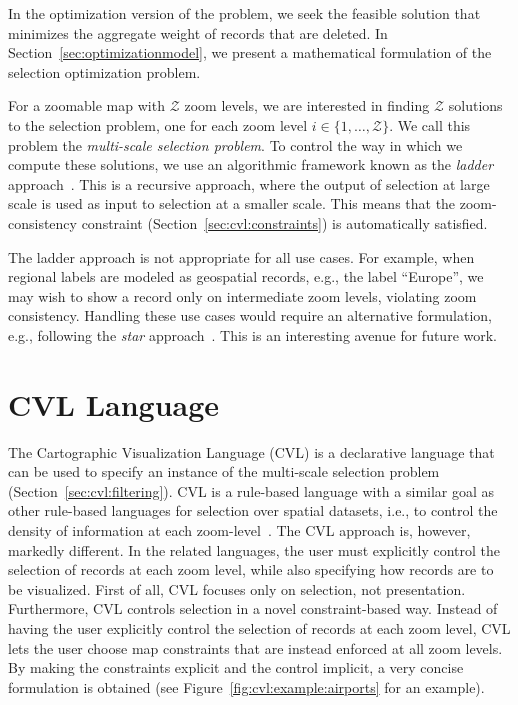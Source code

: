 \documentclass[11pt, oneside]{report}
\begin{document}
{In the optimization version of the problem, we seek the feasible solution that minimizes the aggregate weight of records that are deleted. In Section~\ref{sec:optimizationmodel}, we present a mathematical formulation of the selection optimization problem.

For a zoomable map with $\mathcal{Z}$ zoom levels, we are interested in finding $\mathcal{Z}$ solutions to the selection problem, one for each zoom level $i \in \{ 1, \ldots, \mathcal{Z} \}$. We call this problem the \emph{multi-scale selection problem}. To control the way in which we compute these solutions, we use an algorithmic framework known as the \emph{ladder} approach~\cite{foerster2010challenges}. This is a recursive approach, where the output of selection at large scale is used as input to selection at a smaller scale. This means that the zoom-consistency constraint (Section~\ref{sec:cvl:constraints}) is automatically satisfied.

The ladder approach is not appropriate for all use cases. For example, when regional labels are modeled as geospatial records, e.g., the label ``Europe'', we may wish to show a record only on intermediate zoom levels, violating zoom consistency. Handling these use cases would require an alternative formulation, e.g., following the \emph{star} approach~\cite{foerster2010challenges}. This is an interesting avenue for future work.  


\section{CVL Language}
\label{sec:cvl:language}
The Cartographic Visualization Language (CVL) is a declarative language that can be used to specify an instance of the multi-scale selection problem (Section~\ref{sec:cvl:filtering}). CVL is a rule-based language with a similar goal as other rule-based languages for selection over spatial datasets, i.e., to control the density of information at each zoom-level~\cite{sld,mapnik}. The CVL approach is, however, markedly different. In the related languages, the user must explicitly control the selection of records at each zoom level, while also specifying how records are to be visualized. First of all, CVL focuses only on selection, not presentation. Furthermore, CVL controls selection in a novel constraint-based way. Instead of having the user explicitly control the selection of records at each zoom level, CVL lets the user choose map constraints that are instead enforced at all zoom levels. By making the constraints explicit and the control implicit, a very concise formulation is obtained (see Figure~\ref{fig:cvl:example:airports} for an example).

}
\end{document}
